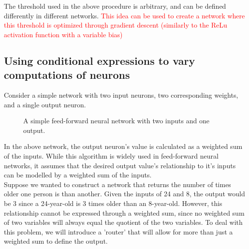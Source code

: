 \documentclass{article}
\begin{document}
	The threshold used in the above procedure is arbitrary, and can be defined differently in different networks. \textcolor{red} {This idea can be used to create a network where this threshold is optimized through gradient descent (similarly to the ReLu activation function with a variable bias)}
	
	\subsection{Using conditional expressions to vary computations of neurons}
	
	Consider a simple network with two input neurons, two corresponding weights, and a single output neuron.
	
	\begin{figure}[!htb]
		
		\centering
		
		\caption{A simple feed-forward neural network with two inputs and one output.}
		
	\end{figure}
	
	\newpage
	
	In the above network, the output neuron's value is calculated as a weighted sum of the inputs. While this algorithm is widely used in feed-forward neural networks, it assumes that the desired output value's relationship to it's inputs can be modelled by a weighted sum of the inputs.  \\
	
	Suppose we wanted to construct a network that returns the number of times older one person is than another. Given the inputs of 24 and 8, the output would be 3 since a 24-year-old is 3 times older than an 8-year-old. However, this relationship cannot be expressed through a weighted sum, since no weighted sum of two variables will always equal the quotient of the two variables. To deal with this problem, we will introduce a 'router' that will allow for more than just a weighted sum to define the output.
	
\end{document}

